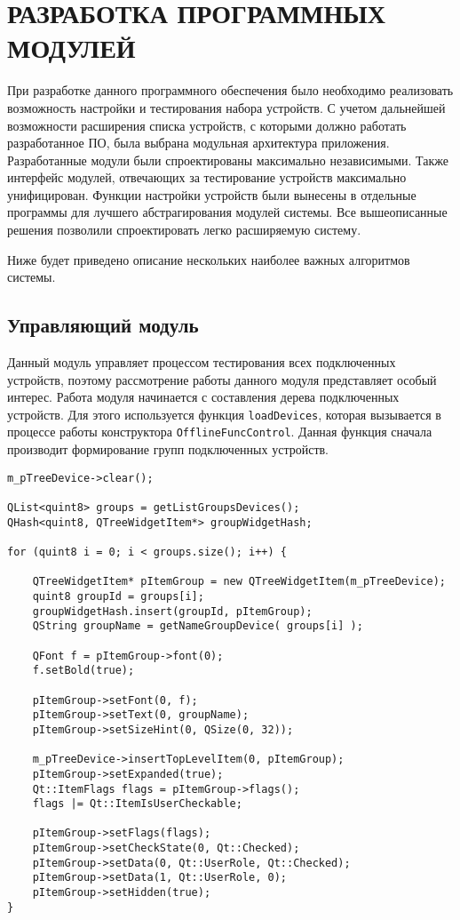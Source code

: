 \section{РАЗРАБОТКА ПРОГРАММНЫХ МОДУЛЕЙ}
\label{sec:modules}

При разработке данного программного обеспечения было необходимо реализовать возможность настройки и тестирования
набора устройств. С учетом дальнейшей возможности расширения списка устройств, с которыми должно работать разработанное
ПО, была выбрана модульная архитектура приложения. Разработанные модули были спроектированы максимально независимыми.
Также интерфейс модулей, отвечающих за тестирование устройств максимально унифицирован. Функции настройки устройств были
вынесены в отдельные программы для лучшего абстрагирования модулей системы. Все вышеописанные решения
позволили спроектировать легко расширяемую систему.

Ниже будет приведено описание нескольких наиболее важных алгоритмов системы.

\subsection{Управляющий модуль}
Данный модуль управляет процессом тестирования всех подключенных устройств, поэтому рассмотрение работы данного модуля
представляет особый интерес.
Работа модуля начинается с составления дерева подключенных устройств. Для этого используется функция
\texttt{loadDevices}, которая вызывается в процессе работы конструктора \texttt{OfflineFuncControl}.
Данная функция сначала производит формирование групп подключенных устройств.
\begin{verbatim}
m_pTreeDevice->clear();

QList<quint8> groups = getListGroupsDevices();
QHash<quint8, QTreeWidgetItem*> groupWidgetHash;

for (quint8 i = 0; i < groups.size(); i++) {

	QTreeWidgetItem* pItemGroup = new QTreeWidgetItem(m_pTreeDevice);
	quint8 groupId = groups[i];
	groupWidgetHash.insert(groupId, pItemGroup);
	QString groupName = getNameGroupDevice( groups[i] );

	QFont f = pItemGroup->font(0);
	f.setBold(true);

	pItemGroup->setFont(0, f);
	pItemGroup->setText(0, groupName);
	pItemGroup->setSizeHint(0, QSize(0, 32));

	m_pTreeDevice->insertTopLevelItem(0, pItemGroup);
	pItemGroup->setExpanded(true);
	Qt::ItemFlags flags = pItemGroup->flags();
	flags |= Qt::ItemIsUserCheckable;

	pItemGroup->setFlags(flags);
	pItemGroup->setCheckState(0, Qt::Checked);
	pItemGroup->setData(0, Qt::UserRole, Qt::Checked);
	pItemGroup->setData(1, Qt::UserRole, 0);
	pItemGroup->setHidden(true);
}
\end{verbatim}
\medskip

